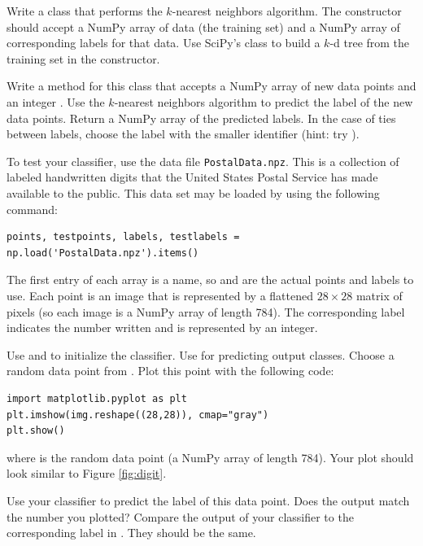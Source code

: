 \begin{problem} %
Write a class that performs the $k$-nearest neighbors algorithm.
The constructor should accept a NumPy array of data (the training set) and a NumPy array of corresponding labels for that data.
Use SciPy's  class to build a $k$-d tree from the training set in the constructor.

Write a method for this class that accepts a NumPy array of new data points and an integer .
Use the $k$-nearest neighbors algorithm to predict the label of the new data points.
Return a NumPy array of the predicted labels.
In the case of ties between labels, choose the label with the smaller identifier (hint: try ).

To test your classifier, use the data file \texttt{PostalData.npz}.
This is a collection of labeled handwritten digits that the United States Postal Service has made available to the public.
This data set may be loaded by using the following command:
\begin{lstlisting}
points, testpoints, labels, testlabels = np.load('PostalData.npz').items()
\end{lstlisting}

The first entry of each array is a name, so  and  are the actual points and labels to use.
Each point is an image that is represented by a flattened $28 \times 28$ matrix of pixels (so each image is a NumPy array of length 784).
The corresponding label indicates the number written and is represented by an integer.

Use  and  to initialize the classifier. Use  for predicting output classes. Choose a random data point from . Plot this point with the following code:
\begin{lstlisting}
import matplotlib.pyplot as plt
plt.imshow(img.reshape((28,28)), cmap="gray")
plt.show()
\end{lstlisting}
where  is the random data point (a NumPy array of length 784). Your plot should look similar to Figure \ref{fig:digit}.

Use your classifier to predict the label of this data point.
Does the output match the number you plotted?
Compare the output of your classifier to the corresponding label in .
They should be the same.

\end{problem}
